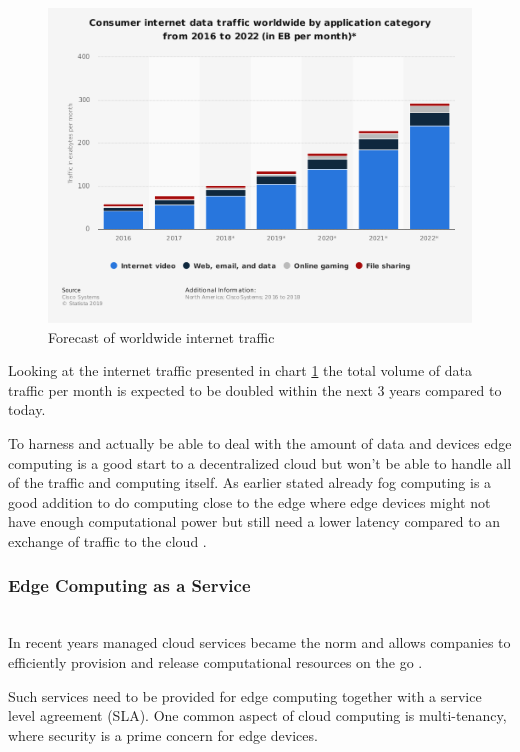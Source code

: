 \begin{figure}[H]
    \centering
    \includegraphics[width=1\textwidth,height=0.8\textwidth]{resources/images/global_traffic.png}
    \caption{Forecast of worldwide internet traffic\cite{statista2}}
    \label{fig:global_traffic}
\end{figure}


Looking at the internet traffic presented in chart \ref{fig:global_traffic} the total volume of data traffic per month is expected to be doubled within the next 3 years compared to today.

To harness and actually be able to deal with the amount of data and devices edge computing is a good start to a decentralized cloud but won’t be able to handle all of the traffic and computing itself. As earlier stated already fog computing is a good addition to do computing close to the edge where edge devices might not have enough computational power but still need a lower latency compared to an exchange of traffic to the cloud \cite{7796149}.

\subsubsection{Edge Computing as a Service}\hspace*{\fill} \\
In recent years managed cloud services became the norm and allows companies to efficiently provision and release computational resources on the go \cite{7796149}.

Such services need to be provided for edge computing together with a service level agreement (SLA).
One common aspect of cloud computing is multi-tenancy, where security is a prime concern for edge devices.

